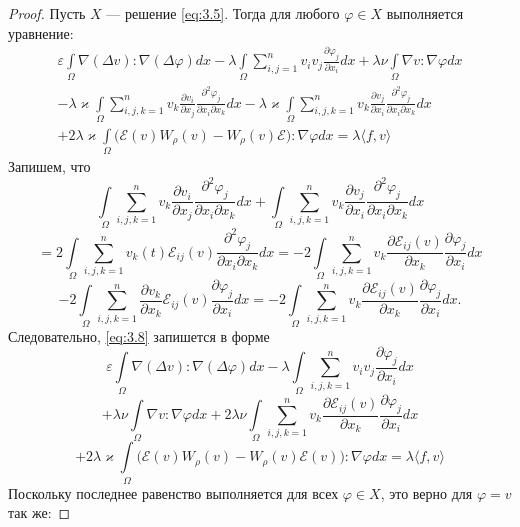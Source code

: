 \begin{proof}
Пусть $X$ --- решение \ref{eq:3.5}. Тогда для любого $\varphi\in  X$ выполняется уравнение:
\begin{equation}\label{eq:3.8}
    \begin{gathered}
        \varepsilon\int\limits_{\Omega}\nabla (\Delta v):\nabla (\Delta\varphi)dx - \lambda\int\limits_{\Omega}\sum_{i,j=1}^n v_iv_j
        \frac{\partial\varphi_j}{\partial x_i}dx +\lambda\nu\int\limits_{\Omega}\nabla v : \nabla\varphi dx \\
        -\lambda\varkappa\int\limits_{\Omega}\sum_{i,j,k=1}^n v_k\frac{\partial v_i}{\partial x_j}\frac{\partial^2 \varphi_j}{\partial x_i\partial x_k}dx 
        -\lambda\varkappa\int\limits_{\Omega}\sum_{i,j,k=1}^n v_k\frac{\partial v_j}{\partial x_i}\frac{\partial^2 \varphi_j}{\partial x_i\partial x_k}dx \\
        +2\lambda\varkappa\int\limits_{\Omega}\bigg(\mathcal{E}(v)W_{\rho}(v)-W_{\rho}(v)\mathcal{E}\bigg):\nabla\varphi dx=\lambda\langle f, v\rangle
    \end{gathered}
\end{equation}
    Запишем, что  
    $$\int\limits_{\Omega}\sum_{i,j,k=1}^n v_k\frac{\partial v_i}{\partial x_j}\frac{\partial^2 \varphi_j}{\partial x_i\partial x_k}dx+
    \int\limits_{\Omega}\sum_{i,j,k=1}^n v_k\frac{\partial v_j}{\partial x_i}\frac{\partial^2 \varphi_j}{\partial x_i\partial x_k}dx $$
    $$= 2\int\limits_{\Omega}\sum_{i,j,k=1}^n v_k(t)\mathcal{E}_{ij}(v)\frac{\partial^2 \varphi_j}{\partial x_i\partial x_k}dx=-2
    \int\limits_{\Omega}\sum_{i,j,k=1}^n v_k\frac{\partial\mathcal{E}_{ij}(v)}{\partial x_k}\frac{\partial\varphi_j}{\partial x_i}dx $$
    $$-2\int\limits_{\Omega}\sum_{i,j,k=1}^n\frac{\partial v_k}{\partial x_k}\mathcal{E}_{ij}(v)\frac{\partial\varphi_j}{\partial x_i}dx
    =-2\int\limits_{\Omega}\sum_{i,j,k=1}^n v_k \frac{\partial\mathcal{E}_{ij}(v)}{\partial x_k}\frac{\partial\varphi_j}{\partial x_i}dx.$$
    Следовательно, \ref{eq:3.8} запишется в форме
    $$\varepsilon\int\limits_{\Omega}\nabla(\Delta v):\nabla(\Delta\varphi)dx-\lambda\int\limits_{\Omega}\sum_{i,j,k=1}^n v_iv_j\frac{\partial\varphi_j}{\partial x_i}dx$$
    $$+\lambda\nu\int\limits_{\Omega}\nabla v:\nabla\varphi dx+2\lambda\nu\int\limits_{\Omega}\sum_{i,j,k=1}^n v_k\frac{\partial\mathcal{E}_{ij}(v)}{\partial x_k}\frac{\partial\varphi_j}{\partial x_i}dx$$
    $$+2\lambda\varkappa\int\limits_{\Omega}\bigg(\mathcal{E}(v)W_{\rho}(v)-W_{\rho}(v)\mathcal{E}(v)\bigg):\nabla\varphi dx=\lambda\langle f, v\rangle$$
    Поскольку последнее равенство выполняется для всех $\varphi\in X$, это верно для $\varphi=v$ так же:

\end{proof}
